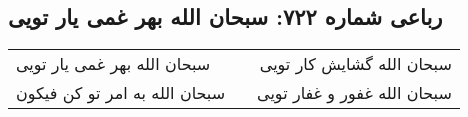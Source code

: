 \begin{center}
\section*{رباعی شماره ۷۲۲: سبحان الله بهر غمی یار تویی}
\label{sec:sh722}
\begin{longtable}{l p{0.5cm} r}
سبحان الله بهر غمی یار تویی
&&
سبحان الله گشایش کار تویی
\\
سبحان الله به امر تو کن فیکون
&&
سبحان الله غفور و غفار تویی
\\
\end{longtable}
\end{center}
